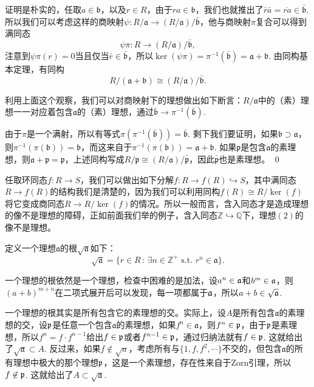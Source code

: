 证明是朴实的，任取$a\in \mathfrak{b}$，以及$r \in R$，由于$ra\in \mathfrak{b}$，我们也就推出了$\bar{r}\bar{a}=\overline{ra}\in \bar{\mathfrak{b}}$. 所以我们可以考虑这样的商映射$\psi: R/\mathfrak{a}\to (R/\mathfrak{a})/\bar{\mathfrak{b}}$，他与商映射$\pi$复合可以得到满同态
\[
	\psi\pi:R\to (R/\mathfrak{a})/\bar{\mathfrak{b}},
\]
注意到$\psi\pi(r)=0$当且仅当$\bar{r}\in \bar{\mathfrak{b}}$，所以$\ker(\psi\pi)=\pi^{-1}(\bar{\mathfrak{b}})=\mathfrak{a}+\mathfrak{b}$. 由同构基本定理，有同构
\[
	R/(\mathfrak{a}+\mathfrak{b})\cong (R/\mathfrak{a})/\bar{\mathfrak{b}}.
\]

\para 利用上面这个观察，我们可以对商映射下的理想做出如下断言：$R/\mathfrak{a}$中的（素）理想一一对应着包含$\mathfrak{a}$的（素）理想，通过$\bar{\mathfrak{b}}\to \pi^{-1}(\bar{\mathfrak{b}})$.

\proof 
	由于$\pi$是一个满射，所以有等式$\pi(\pi^{-1}(\bar{\mathfrak{b}}))=\bar{\mathfrak{b}}$. 剩下我们要证明，如果$\mathfrak{b}\supset \mathfrak{a}$，则$\pi^{-1}(\pi(\mathfrak{b}))=\mathfrak{b}$，而这来自于$\pi^{-1}(\pi(\mathfrak{b}))=\mathfrak{a}+\mathfrak{b}$. 如果$\mathfrak{p}$是包含$\mathfrak{a}$的素理想，则$\mathfrak{a}+\mathfrak{p}=\mathfrak{p}$，上述同构写成$R/\mathfrak{p}\cong (R/\mathfrak{a})/\bar{\mathfrak{p}}$，因此$\bar{\mathfrak{p}}$也是素理想。
\qed

\para 任取环同态$f:R\to S$，我们可以做出如下分解$f:R\to f(R)\hookrightarrow S$，其中满同态$R\to f(R)$的结构我们是清楚的，因为我们可以利用同构$f(R)\cong R/\ker(f)$将它变成商同态$R\to R/\ker(f)$的情况。所以一般而言，含入同态才是造成理想的像不是理想的障碍，正如前面我们举的例子，含入同态$\mathbb{Z}\hookrightarrow \mathbb{Q}$下，理想$(2)$的像不是理想。

\para 定义一个理想$\mathfrak{a}$的根$\sqrt{\mathfrak{a}}$如下：
\[
	\sqrt{\mathfrak{a}}=\{r\in R\,:\,\exists n\in \mathbb{Z}^+\text{ s.t. }r^n\in \mathfrak{a}\}.
\]

一个理想的根依然是一个理想，检查中困难的是加法，设$a^n\in \mathfrak{a}$和$b^m\in \mathfrak{a}$，则$(a+b)^{m+n}$在二项式展开后可以发现，每一项都属于$\mathfrak{a}$，所以$a+b\in \sqrt{\mathfrak{a}}$.

一个理想的根其实是所有包含它的素理想的交。实际上，设$A$是所有包含$\mathfrak{a}$的素理想的交，设$\mathfrak{p}$是任意一个包含$\mathfrak{a}$的素理想，如果$f^n\in \mathfrak{a}$，则$f^n\in \mathfrak{p}$，由于$\mathfrak{p}$是素理想，所以$f^n=f\cdot f^{n-1}$给出$f\in\mathfrak{p}$或者$f^{n-1}\in\mathfrak{p}$，通过归纳法就有$f\in \mathfrak{p}$. 这就给出了$\sqrt{\mathfrak{a}}\subset A$. 反过来，如果$f\not\in \sqrt{a}$，考虑所有与$\{1,f,f^2,\cdots\}$不交的，但包含$\mathfrak{a}$的所有理想中极大的那个理想$\mathfrak{p}$，这是一个素理想，存在性来自于Zorn引理，所以$f\not\in \mathfrak{p}$. 这就给出了$A\subset \sqrt{\mathfrak{a}}$.
